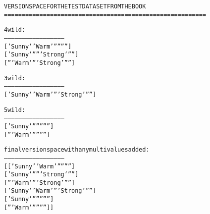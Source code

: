 \begin{multicols}{2}
\begin{shaded}
\scriptsize
\begin{alltt}
VERSION SPACE FOR THE TEST DATASET FROM THE BOOK
=========================================================

 4 wild :
--------------------------------------------------
['Sunny' 'Warm' '' '' '' '']
['Sunny' '' '' 'Strong' '' '']
['' 'Warm' '' 'Strong' '' '']

 3 wild :
--------------------------------------------------
['Sunny' 'Warm' '' 'Strong' '' '']

 5 wild :
--------------------------------------------------
['Sunny' '' '' '' '' '']
['' 'Warm' '' '' '' '']


 final version space with any multivalues added :
--------------------------------------------------
[['Sunny' 'Warm' '' '' '' '']
 ['Sunny' '' '' 'Strong' '' '']
 ['' 'Warm' '' 'Strong' '' '']
 ['Sunny' 'Warm' '' 'Strong' '' '']
 ['Sunny' '' '' '' '' '']
 ['' 'Warm' '' '' '' '']]
\end{alltt}
\small
\end{shaded}
\end{multicols}

\newpage









